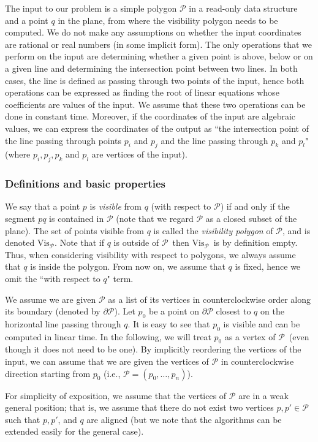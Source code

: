 \documentclass[a4paper]{article}
\newcommand{\Poly}{\ensuremath{\mathcal{P}}}               \newcommand{\bd}{\ensuremath{\partial \Poly} }                 \newcommand{\Vis}{\ensuremath{\mathrm{Vis}_\Poly}} \newcommand{\VisC}{\ensuremath{\mathrm{Vis}_{\mathcal{C}}}} \newcommand{\VisCprime}{\ensuremath{\mathrm{Vis}_{\mathcal{C'}}}} \newcommand{\E}{\ensuremath{\mathrm{E}}}                    \newcommand{\Rin}{\ensuremath{r}}      \newcommand{\Rout}{\ensuremath{\bar{r}}}      \newcommand{\Hout}{\ensuremath{\bar{h}}}      \newcommand{\chain}{\ensuremath{{\mathrm{Chain}}}}     \newcommand{\region}{\ensuremath{{{\mathcal R}}}}
\begin{document}
The input to our problem is a simple polygon $\Poly$ in a read-only data structure and a point $q$ in the plane, from where the visibility polygon needs to be computed.
We do not make any assumptions on whether the input coordinates are rational or real numbers (in some implicit form). The only operations that we perform on the input are determining whether a given point is above, below or on a given line and determining the intersection point between two lines. In both cases, the line is defined as passing through two points of the input, hence both operations can be expressed as finding the root of linear equations whose coefficients are values of the input. We assume that these two operations can be done in constant time. Moreover, if the coordinates of the input are algebraic values, we can express the coordinates of the output as ``the intersection point of the line passing through points $p_i$ and $p_j$ and the line passing through $p_k$ and $p_l$" (where $p_i,p_j,p_k$ and $p_l$ are vertices of the input). 


\subsubsection*{Definitions and basic properties}
We say that a point $p$ is \emph{visible} from $q$ (with respect to $\Poly$) if and only if the segment $pq$ is contained in $\Poly$ (note that we regard $\Poly$ as a closed subset of the plane). The set of points visible from $q$ is called the \emph{visibility polygon} of \Poly, and is denoted \Vis. Note that if $q$ is outside of \Poly\ then \Vis\ is by definition empty. Thus, when considering visibility with respect to polygons, we always assume that $q$ is inside the polygon. From now on, we assume that $q$ is fixed, hence we omit the ``with respect to $q$" term.

We assume we are given $\Poly$ as a list of its vertices in counterclockwise order along its boundary (denoted by $\bd$). Let $p_0$ be a point on $\bd$ closest to $q$ on the horizontal line passing through $q$. It is easy to see that $p_0$ is visible and can be computed in linear time. In the following, we will treat $p_0$ as a vertex of \Poly\ (even though it does not need to be one). By implicitly reordering the vertices of the input, we can assume that we are given the vertices of $\Poly$ in counterclockwise direction starting from $p_0$ (i.e., $\Poly = (p_0, \ldots, p_n)$). 

For simplicity of exposition, we assume that the vertices of $\Poly$ are in a weak general position; that is, we assume that there do not exist two vertices $p,p'\in\Poly$ such that $p, p'$, and $q$ are aligned (but we note that the algorithms can be extended easily for the general case). 
\end{document}

